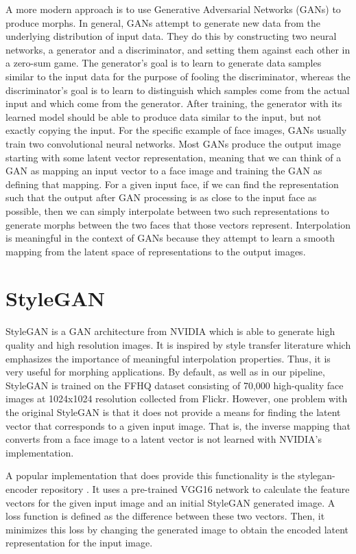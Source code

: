 \documentclass[12pt]{article}
\begin{document}
A more modern approach is to use Generative Adversarial Networks (GANs) to produce morphs. In general, GANs attempt to generate new data from the underlying distribution of input data. They do this by constructing two neural networks, a generator and a discriminator, and setting them against each other in a zero-sum game. The generator's goal is to learn to generate data samples similar to the input data for the purpose of fooling the discriminator, whereas the discriminator's goal is to learn to distinguish which samples come from the actual input and which come from the generator. After training, the generator with its learned model should be able to produce data similar to the input, but not exactly copying the input. For the specific example of face images, GANs usually train two convolutional neural networks. Most GANs produce the output image starting with some latent vector representation, meaning that we can think of a GAN as mapping an input vector to a face image and training the GAN as defining that mapping. For a given input face, if we can find the representation such that the output after GAN processing is as close to the input face as possible, then we can simply interpolate between two such representations to generate morphs between the two faces that those vectors represent. Interpolation is meaningful in the context of GANs because they attempt to learn a smooth mapping from the latent space of representations to the output images.

\section{StyleGAN}
\par
StyleGAN \cite{stylegan} is a GAN architecture from NVIDIA which is able to generate high quality and high resolution images. It is inspired by style transfer literature which emphasizes the importance of meaningful interpolation properties. Thus, it is very useful for morphing applications. By default, as well as in our pipeline, StyleGAN is trained on the FFHQ dataset consisting of 70,000 high-quality face images at 1024x1024 resolution collected from Flickr. However, one problem with the original StyleGAN is that it does not provide a means for finding the latent vector that corresponds to a given input image. That is, the inverse mapping that converts from a face image to a latent vector is not learned with NVIDIA's implementation.

\par
A popular implementation that does provide this functionality is the stylegan-encoder repository \cite{stylegan-encoder}. It uses a pre-trained VGG16 network to calculate the feature vectors for the given input image and an initial StyleGAN generated image. A loss function is defined as the difference between these two vectors. Then, it minimizes this loss by changing the generated image to obtain the encoded latent representation for the input image.
\end{document}
